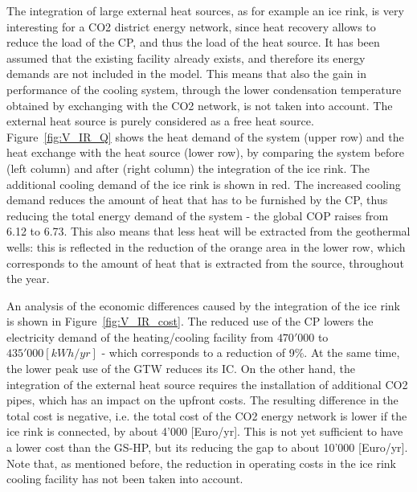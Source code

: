 \documentclass{article}
\begin{document}
The integration of large external heat sources, as for example an ice rink, is very interesting for a CO2 district energy network, since heat recovery allows to reduce the load of the CP, and thus the load of the heat source. It has been assumed that the existing facility already exists, and therefore its energy demands are not included in the model. This means that also the gain in performance of the cooling system, through the lower condensation temperature obtained by exchanging with the CO2 network, is not taken into account. The external heat source is purely considered as a free heat source.\\

Figure~\ref{fig:V_IR_Q} shows the heat demand of the system (upper row) and the heat exchange with the heat source (lower row), by comparing the system before (left column) and after (right column) the integration of the ice rink. The additional cooling demand of the ice rink is shown in red. The increased cooling demand reduces the amount of heat that has to be furnished by the CP, thus reducing the total energy demand of the system - the global COP raises from 6.12 to 6.73. This also means that less heat will be extracted from the geothermal wells: this is reflected in the reduction of the orange area in the lower row, which corresponds to the amount of heat that is extracted from the source, throughout the year.


An analysis of the economic differences caused by the integration of the ice rink is shown in Figure~\ref{fig:V_IR_cost}. The reduced use of the CP lowers the electricity demand of the heating/cooling facility from $470'000$ to $435'000 [kWh/yr]$ - which corresponds to a reduction of 9\%. At the same time, the lower peak use of the GTW reduces its IC. On the other hand, the integration of the external heat source requires the installation of additional CO2 pipes, which has an impact on the upfront costs. The resulting difference in the total cost is negative, i.e. the total cost of the CO2 energy network is lower if the ice rink is connected, by about 4'000 [Euro/yr]. This is not yet sufficient to have a lower cost than the GS-HP, but its reducing the gap to about 10'000 [Euro/yr]. Note that, as mentioned before, the reduction in operating costs in the ice rink cooling facility has not been taken into account.\\

%
\end{document}
